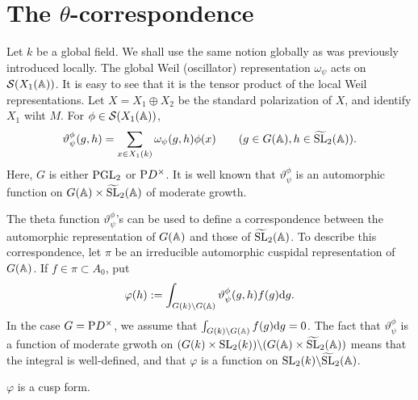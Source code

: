 \section{The $\theta$-correspondence}
\label{sec:3}

Let $k$ be a global field.
We shall use the same notion globally as was previously introduced locally.
The global Weil (oscillator) representation $\omega_\psi$ acts on $\mathcal{S}(X_1(\mathbb{A}))$.
It is easy to see that it is the tensor product of the local Weil representations.
Let $X = X_1 \oplus X_2$ be the standard polarization of $X$, and identify $X_1$ wiht $M$.
For $\phi \in \mathcal{S}(X_1(\mathbb{A}))$,
\[
\vartheta_\psi^\phi(g, h) = \sum_{x \in X_1(k)} \omega_\psi(g, h) \phi(x)\qquad (g \in G(\mathbb{A}), h \in \widetilde{\mathrm{SL}}_2(\mathbb{A})).
\]
Here, $G$ is either $\mathrm{PGL}_2$ or $\mathrm{P} D^\times$.
It is well known that $\vartheta_\psi^\phi$ is an automorphic function on $G(\mathbb{A}) \times \widetilde{\mathrm{SL}}_2(\mathbb{A})$ of moderate growth.

The theta function $\vartheta_\psi^\phi$'s can be used to define a correspondence between the automorphic representation of $G(\mathbb{A})$ and those of $\widetilde{\mathrm{SL}}_2(\mathbb{A})$.
To describe this correspondence, let $\pi$ be an irreducible automorphic cuspidal representation of $G(\mathbb{A})$.
If $f \in \pi \subset A_0$, put
\[
\varphi(h) := \int_{G(k) \backslash G(\mathbb{A})} \vartheta_\psi^\phi(g, h) f(g) \mathrm{d} g.
\]
In the case $G = \mathrm{P} D^\times$, we assume that $\int_{G(k)\backslash G(\mathbb{A})} f(g) \mathrm{d} g = 0$.
The fact that $\vartheta_\psi^\phi$ is a function of moderate grwoth on $(G(k) \times \mathrm{SL}_2(k)) \backslash (G(\mathbb{A}) \times \widetilde{\mathrm{SL}}_2(\mathbb{A}))$ means that the integral is well-defined, and that $\varphi$ is a function on $\mathrm{SL}_2(k) \backslash \widetilde{\mathrm{SL}}_2(\mathbb{A})$.

\begin{claim}
$\varphi$ is a cusp form.
\end{claim}

